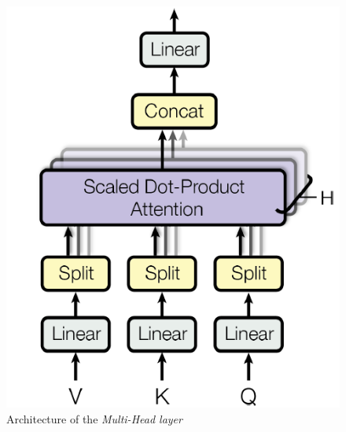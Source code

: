\begin{multicols}{2}
    \begin{figure}[H]
        \centering
        \includegraphics[scale=0.7]{img/multi_head.png}
        \caption{Architecture of the \textit{Multi-Head layer}}
    \end{figure}


\end{multicols}
